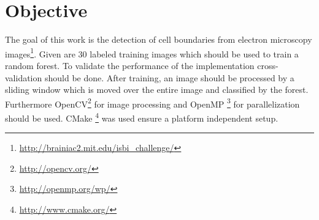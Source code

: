 \section{Objective}
\label{sec:objective}

The goal of this work is the detection of cell boundaries from electron microscopy images\footnote{\label{foot:1} \url{http://brainiac2.mit.edu/isbi_challenge/}}. Given are 30 labeled training images which should be used to train a random forest. To validate the performance of the implementation cross-validation should be done.
After training, an image should be processed by a sliding window which is moved over the entire image and classified by the forest.
Furthermore OpenCV\footnote{\label{foot:2} \url{http://opencv.org/}} for image processing and OpenMP \footnote{\label{foot:3} \url{http://openmp.org/wp/}} for parallelization should be used. CMake \footnote{\label{foot:4} \url{http://www.cmake.org/}} was used ensure a platform independent setup.

